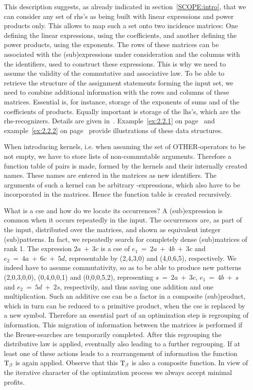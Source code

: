 This description suggests, as already indicated in section~\ref{SCOPE:intro},
that we
can consider any set of rhs's as being built with linear expressions
and power products only. This allows to map such a set onto two
incidence matrices: One defining the linear expressions, using the
coefficients, and another defining the power products, using the
exponents. The rows of these matrices can be associated with the
(sub)expressions under consideration and the columns with the
identifiers, used to construct these expressions. This is why we need
to assume the validity of the commutative and associative law. To be
able to retrieve the structure of the assignment statements forming
the input set, we need to combine additional information with the rows
and columns of these matrices. Essential is, for instance, storage of
the exponents of sums and of the coefficients of products.  Equally
important is storage of the lhs's, which are the rhs-recognizers.
Details are given in~\cite{vanHulzen:83}. Example~\ref{ex:2.2.1} on
page~\pageref{ex:2.2.1} and example~\ref{ex:2.2.2} on page~\pageref{ex:2.2.2}
provide illustrations of these data structures.

When introducing kernels, i.e. when assuming the set of
OTHER-operators to be not empty, we have to store lists of
non-commutable arguments.  Therefore a function table of pairs is
made, formed by the kernels and their internally created names. These
names are entered in the matrices as new identifiers. The arguments of
such a kernel can be arbitrary {\REDUCE}-expressions, which also have to
be incorporated in the matrices.  Hence the function table is created
recursively.

What is a cse and how do we locate its occurrences?  A (sub)expression
is common when it occurs repeatedly in the input. The occurrences are,
as part of the input, distributed over the matrices, and shown as
equivalent integer (sub)patterns.  In fact, we repeatedly search for
completely dense (sub)matrices of rank 1.  The expression $2a\ +\ 3c$
is a cse of ${e_1} \ =\ 2a\ +\ 4b\ +\ 3c$ and ${e_2}\ =\ 4a\ +\ 6c\ +\
5d$, representable by (2,4,3,0) and (4,0,6,5), respectively.  We
indeed have to assume commutativity, so as to be able to produce new
patterns (2,0,3,0,0), (0,4,0,0,1) and (0,0,0,5,2), representing $s\ =\
2a\ +\ 3c$, ${e_1}\ =\ 4b\ +\ s$ and ${e_2}\ =\ 5d\ +\ 2s$,
respectivily, and thus saving one addition and one multiplication.
Such an additive cse can be a factor in a composite (sub)product,
which in turn can be reduced to a primitive product, when the cse is
replaced by a new symbol.  Therefore an essential part of an
optimization step is regrouping of information. This migration of
information between the matrices is performed if the Breuer-searches
are temporarily completed.  After this regrouping the distributive law
is applied, eventually also leading to a further regrouping. If at
least one of these actions leads to a rearrangement of information the
function ${\rm T} _{\beta}$ is again applied.  Observe that this
${{\rm T}}_{\beta}$ is also a composite function.  In view of the
iterative character of the optimization process we always accept
minimal profits.

